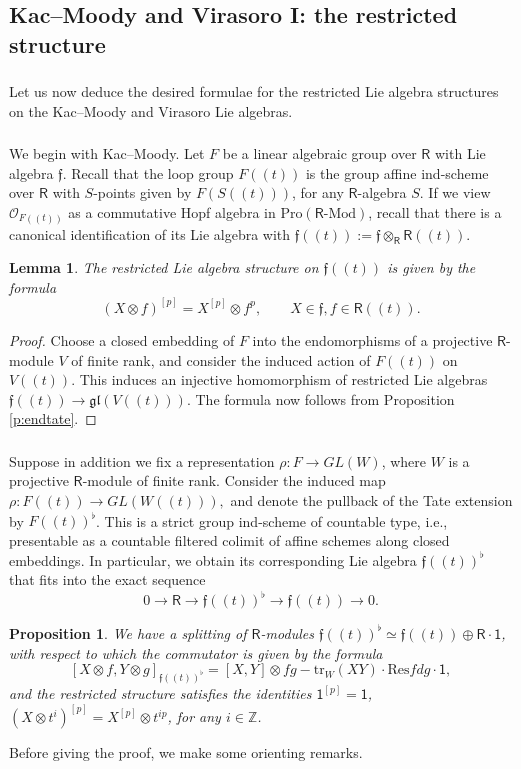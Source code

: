 \documentclass{amsart}
\newtheorem{Prop}[Thm]{Proposition}
\newtheorem{Lem}[Thm]{Lemma}
\theoremstyle{definition}
\newcommand{\gl}{\mathfrak{gl}}
\newcommand{\Pro}{\on{Pro}}
\newcommand{\sss}{\subsubsection{}}
\newcommand{\OO}{\mathscr{O}}
\renewcommand{\mod}{\text{-}\on{Mod}}
\newcommand{\on}{\mathrm}
\newcommand{\Ring}{\mathsf{R}}
\newcommand{\ff}{\mathfrak{f}}
\numberwithin{equation}{section}
\begin{document}
\subsection{Kac--Moody and Virasoro I: the restricted structure}
\label{ss:restrIII}
\sss Let us now deduce the desired formulae for the restricted Lie algebra structures on the Kac--Moody and Virasoro Lie algebras. 

\sss \label{SSS_KM_groups} We begin with Kac--Moody. Let $F$ be a linear algebraic group over $\Ring$ with Lie algebra $\ff$. Recall that the loop group $F(\!(t)\!)$ is the group affine ind-scheme over $\Ring$ with $S$-points given by $F(S(\!(t)\!))$, for any $\Ring$-algebra $S$. If we view $\OO_{F(\!(t)\!)}$ as a commutative Hopf algebra in $\Pro(\Ring\mod)$, recall that there is a canonical identification of its Lie algebra with $\ff(\!(t)\!) := \ff \otimes_{\Ring} \Ring(\!(t)\!).$

\begin{Lem} \label{l:restrloop}The restricted Lie algebra structure on $\ff(\!(t)\!)$ is given by the formula
$$(X \otimes f)^{[p]} = X^{[p]} \otimes f^p, \quad \quad X \in \ff, f \in \Ring(\!(t)\!).$$    
\end{Lem}

\begin{proof} Choose a closed embedding of $F$ into the endomorphisms of a projective $\Ring$-module $V$ of finite rank, and consider the induced action of $F(\!(t)\!)$ on $V(\!(t)\!)$. This induces an {injective} homomorphism of restricted Lie algebras $\ff(\!(t)\!) \rightarrow \gl(V(\!(t)\!))$. The formula now follows from Proposition \ref{p:endtate}.
\end{proof}

\sss\label{SSS_KM_definition}
Suppose in addition we fix a representation $\rho: F \rightarrow GL(W)$, where $W$ is a projective $\Ring$-module of finite rank. Consider the induced map 
$\rho:  F(\!(t)\!) \rightarrow GL(W(\!(t)\!)),$ and denote the pullback of the Tate extension by $F(\!(t)\!)^\flat$. This is a strict group ind-scheme of countable type, i.e., presentable as a countable filtered colimit of affine schemes along closed embeddings. 
In particular, we obtain its corresponding Lie algebra $\ff(\!(t)\!)^\flat$ that fits into the exact sequence
$$0 \rightarrow \Ring \rightarrow \ff(\!(t)\!)^\flat \rightarrow \ff(\!(t)\!) \rightarrow 0.$$
\begin{Prop} \label{p:kacmoodyrestr}We have a splitting of $\Ring$-modules $\ff(\!(t)\!)^\flat \simeq \ff(\!(t)\!) \oplus \Ring \cdot \mathsf{1}$, with respect to which the commutator is given by the formula 
$$[X \otimes f, Y \otimes g]_{\ff(\!(t)\!)^\flat} = [X,Y] \otimes fg - \on{tr}_W(XY) \cdot \on{Res} f dg \cdot \mathsf{1},$$
and the restricted structure satisfies the identities $\mathsf{1}^{[p]} = \mathsf{1}$, $(X \otimes t^i)^{[p]} = X^{[p]} \otimes t^{ip}$, for any $i \in \mathbb{Z}$. 
\end{Prop}
Before giving the proof, we make some orienting remarks. 
\end{document}
